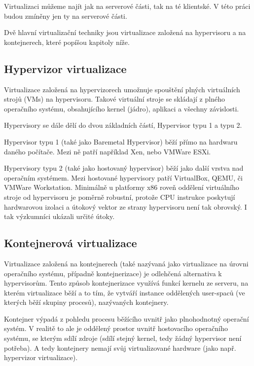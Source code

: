 \documentclass[thesis=M,czech]{FITthesis}[2019/12/23]
\theoremstyle{plain}
\theoremstyle{definition}
\begin{document}
Virtualizaci můžeme najít jak na serverové části, tak na té klientské. V této práci budou zmíněny jen ty na serverové části.

Dvě hlavní virtualizační techniky jsou virtualizace založená na hypervisoru a na kontejnerech, které popíšou kapitoly níže.

\subsection{Hypervizor virtualizace}

Virtualizace založená na hypervizorech umožnuje spouštění plných virtuálních strojů (VMs) na hypervisoru. Takové virtuální stroje se skládají z plného operačního systému, obsahujícího kernel (jádro), aplikaci a všechny závislosti. \cite{virt-comparison}


Hypervisory se dále dělí do dvou základních částí, Hypervisor typu 1 a typu 2.

Hypervisor typu 1 (také jako Baremetal Hypervisor) běží přímo na hardwaru daného počítače. Mezi ně patří například Xen, nebo  VMWare ESXi. 

Hypervisory typu 2 (také jako hostovaný hypervisor) běží jako další vrstva nad operačním systémem. Mezi hostované hypervisory patří VirtualBox, QEMU, či VMWare Workstation. Minimálně u platformy x86 roveň oddělení virtuálního stroje od hypervisoru je poměrně robustní, protože CPU instrukce poskytují hardwarovou izolaci a útokový vektor ze strany hypervisoru není tak obrovský. I tak výzkumníci ukázali určité útoky.  



\subsection{Kontejnerová virtualizace}


Virtualizace založená na kontejnerech (také nazývaná jako virtualizace na úrovni operačního systému, případně kontejnerizace) je odlehčená alternativa k hypervisorům. Tento způsob kontejnerizace využívá funkcí kernelu ze serveru, na kterém virtualizace běží a to tím, že vytváří instance oddělených user-spaců (ve kterých běží skupiny procesů), nazývaných kontejnery. 

Kontejner výpadá z pohledu procesu běžícího uvnitř jako plnohodnotný operační systém. V realitě to ale je oddělený prostor uvnitř hostovacího operačního systému, se kterým sdílí zdroje (sdílí stejný kernel, tedy žádný hypervisor není potřeba). A tedy kontejnery nemají svůj virtualizované hardware (jako např. hypervizor virtualizace). 
\end{document}
